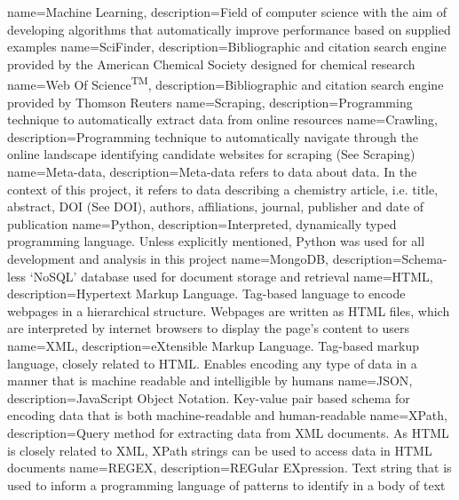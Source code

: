 {
name={Machine Learning},
description={Field of computer science with the aim of developing algorithms that automatically improve performance based on supplied examples \cite{glossarymachinelearning}} 
}
{
name={SciFinder\textsuperscript{\textregistered}},
description={Bibliographic and citation search engine provided by the American Chemical Society designed for chemical research} 
}
{
name={Web Of Science\textsuperscript{TM}},
description={Bibliographic and citation search engine provided by Thomson Reuters} 
}
{
name={Scraping},
description={Programming technique to automatically extract data from online resources} 
}
{
name={Crawling},
description={Programming technique to automatically navigate through the online landscape identifying candidate websites for scraping (See Scraping)} 
}
{
name={Meta-data},
description={Meta-data refers to data about data. In the context of this project, it refers to data describing a chemistry article, i.e. title, abstract, DOI (See DOI), authors, affiliations, journal, publisher and date of publication}
}
{
name={Python},
description={Interpreted, dynamically typed programming language. Unless explicitly mentioned, Python was used for all development and analysis in this project} 
}
{
name={MongoDB},
description={Schema-less `NoSQL' database used for document storage and retrieval} 
}
{
name={HTML},
description={Hypertext Markup Language. Tag-based language to encode webpages in a hierarchical structure. Webpages are written as HTML files, which are interpreted by internet browsers to display the page's content to users} 
}
{
name={XML},
description={eXtensible Markup Language. Tag-based markup language, closely related to HTML. Enables encoding any type of data in a manner that is machine readable and intelligible by humans} 
}
{
name={JSON},
description={JavaScript Object Notation. Key-value pair based schema for encoding data that is both machine-readable and human-readable}
}
{
name={XPath},
description={Query method for extracting data from XML documents. As HTML is closely related to XML, XPath strings can be used to access data in HTML documents} 
}
{
name={REGEX},
description={REGular EXpression. Text string that is used to inform a programming language of patterns to identify in a body of text} 
}

